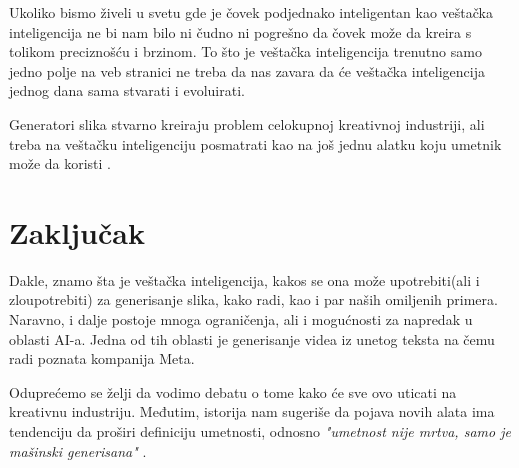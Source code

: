 \documentclass[12pt, letterpaper]{article}
\begin{document}
Ukoliko bismo živeli u svetu gde je čovek podjednako inteligentan kao veštačka inteligencija ne bi nam bilo ni čudno ni pogrešno da čovek može da kreira s tolikom preciznošću i brzinom. To što je veštačka inteligencija trenutno samo jedno polje na veb stranici ne treba da nas zavara da će veštačka inteligencija jednog dana sama stvarati i evoluirati.

Generatori slika stvarno kreiraju problem celokupnoj kreativnoj industriji, ali treba na veštačku inteligenciju posmatrati kao na još jednu alatku koju umetnik može da koristi \cite{fear}.

\section{Zaključak}

Dakle, znamo šta je veštačka inteligencija, kakos se ona može upotrebiti(ali i zloupotrebiti) za generisanje slika, kako radi, kao i par naših omiljenih primera. Naravno, i dalje postoje mnoga ograničenja, ali i mogućnosti za napredak u oblasti AI-a. Jedna od tih oblasti je generisanje videa iz unetog teksta na čemu radi poznata kompanija Meta. 

Oduprećemo se želji da vodimo debatu o tome kako će sve ovo uticati na kreativnu industriju. Međutim, istorija nam sugeriše da pojava novih alata ima tendenciju da proširi definiciju umetnosti, odnosno \textit{"umetnost nije mrtva, samo je mašinski generisana"} \cite{clanaknov}.
\end{document}
